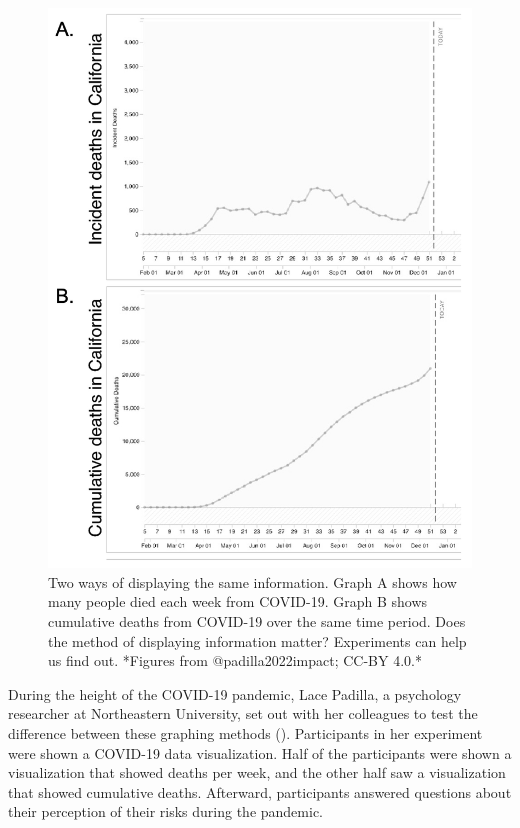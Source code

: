 \documentclass[
]{krantz}
\begin{document}
\begin{figure}

{\centering \includegraphics[width=0.6\linewidth]{images/ch1/covid} 

}

\caption{Two ways of displaying the same information. Graph A shows how many people died each week from COVID-19. Graph B shows cumulative deaths from COVID-19 over the same time period. Does the method of displaying information matter? Experiments can help us find out. *Figures from @padilla2022impact; CC-BY 4.0.*}\label{fig:covid}
\end{figure}

During the height of the COVID-19 pandemic, Lace Padilla, a psychology researcher at Northeastern University, set out with her colleagues to test the difference between these graphing methods (). Participants in her experiment were shown a COVID-19 data visualization. Half of the participants were shown a visualization that showed deaths per week, and the other half saw a visualization that showed cumulative deaths. Afterward, participants answered questions about their perception of their risks during the pandemic.
\end{document}
